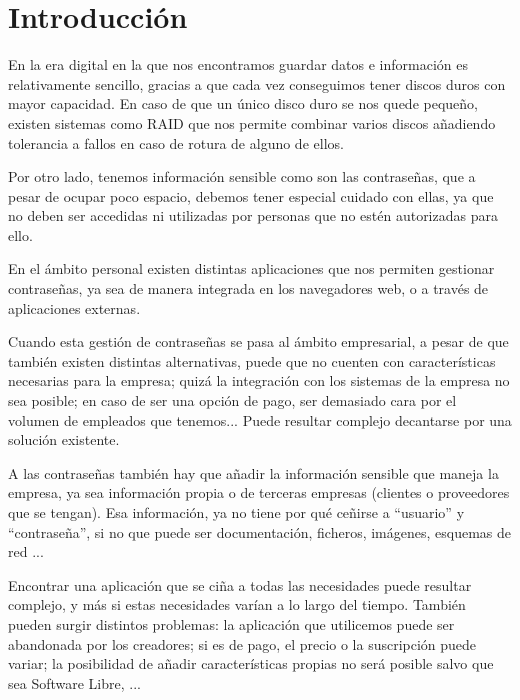 \documentclass{\ClassPath/viu-tfm-template}
\begin{document}


\tableofcontents

\chapter{Introducción}
En la era digital en la que nos encontramos guardar datos e información es relativamente sencillo, gracias a que cada vez conseguimos tener discos duros con mayor capacidad. En caso de que un único disco duro se nos quede pequeño, existen sistemas como RAID que nos permite combinar varios discos añadiendo tolerancia a fallos en caso de rotura de alguno de ellos.

Por otro lado, tenemos información sensible como son las contraseñas, que a pesar de ocupar poco espacio, debemos tener especial cuidado con ellas, ya que no deben ser accedidas ni utilizadas por personas que no estén autorizadas para ello.

En el ámbito personal existen distintas aplicaciones que nos permiten gestionar contraseñas, ya sea de manera integrada en los navegadores web, o a través de aplicaciones externas.

Cuando esta gestión de contraseñas se pasa al ámbito empresarial, a pesar de que también existen distintas alternativas, puede que no cuenten con características necesarias para la empresa; quizá la integración con los sistemas de la empresa no sea posible; en caso de ser una opción de pago, ser demasiado cara por el volumen de empleados que tenemos... Puede resultar complejo decantarse por una solución existente.

A las contraseñas también hay que añadir la información sensible que maneja la empresa, ya sea información propia o de terceras empresas (clientes o proveedores que se tengan). Esa información, ya no tiene por qué ceñirse a “usuario” y “contraseña”, si no que puede ser documentación, ficheros, imágenes, esquemas de red ...

Encontrar una aplicación que se ciña a todas las necesidades puede resultar complejo, y más si estas necesidades varían a lo largo del tiempo. También pueden surgir distintos problemas: la aplicación que utilicemos puede ser abandonada por los creadores; si es de pago, el precio o la suscripción puede variar; la posibilidad de añadir características propias no será posible salvo que sea Software Libre, ...
\end{document}
